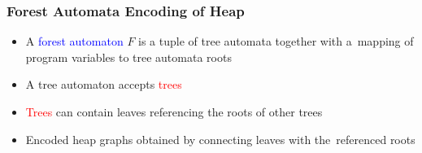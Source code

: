 \documentclass{beamer}
\newenvironment{figure*}%
{\begin{figure}}
{\end{figure}}
\newcommand{\hlbl}[1]{\textcolor{blue}{#1}}
\newcommand{\hlgr}[1]{\textcolor{olive!50!green}{#1}}
\newcommand{\hlrd}[1]{\textcolor{red}{#1}}
\newcommand{\hlye}[1]{\textcolor{magenta}{#1}}
\begin{document}
\begin{frame}
\frametitle{Forest Automata Encoding of Heap}

	\begin{itemize}
			\item A \hlbl{forest automaton} $F$ is a tuple of \hlgr{tree automata}
				together with a~mapping of program variables to tree automata roots
				\pause
			\item A \hlgr{tree automaton} accepts \hlrd{trees}
				\pause
			\item \hlrd{Trees} can contain leaves referencing the roots of other trees
				\pause
			\item Encoded heap graphs obtained by connecting leaves with the~referenced roots
				\pause
	\end{itemize}

	\begin{center}
	\begin{figure}
		\begin{subfigure}{0.5\textwidth}
			\centering
			
		\end{subfigure}%
		\hspace{-0.3cm}
		\begin{subfigure}{0.5\textwidth}
			\centering
			
		\end{subfigure}
	\end{figure}
	\end{center}

\end{frame}

\end{document}
